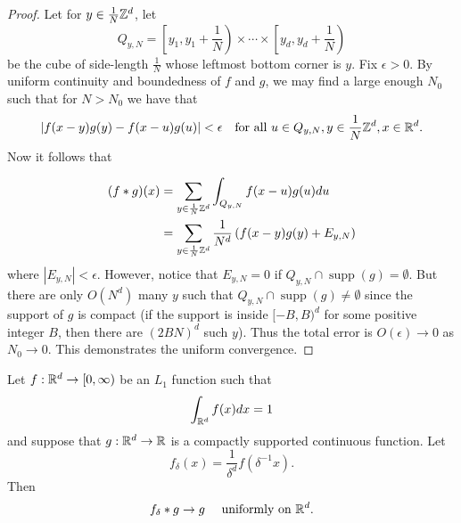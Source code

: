 \documentclass[twoside, a4paper, 10pt]{amsart}
\begin{document}
\begin{proof} Let for $y \in \frac{1}{N}\mathbb{Z}^d$, let $$Q_{y,N} = \left[y_1, y_1 + \frac{1}{N}\right) \times \cdots \times \left[y_d, y_d + \frac{1}{N}\right) $$ be the cube of side-length $\frac{1}{N}$ whose leftmost bottom corner is $y$. Fix $\epsilon>0$. By uniform continuity and boundedness of $f$ and $g$, we may find a large enough $N_0$ such that for $N>N_0$ we have that $$|f(x-y)g(y) - f(x-u)g(u)| < \epsilon \quad\text{for all } u \in Q_{y,N}, y \in \frac{1}{N}\mathbb{Z}^d, x \in \mathbb{R}^d.$$ Now it follows that 

\begin{align*} (f * g)(x) &= \sum_{y \in \frac{1}{N}\mathbb{Z}^d} \int_{Q_{y,N}} f(x-u)g(u) du \\ &= \sum_{y \in \frac{1}{N}\mathbb{Z}^d} \frac{1}{N^d}\left(f(x-y)g(y) + E_{y,N}\right)\end{align*} where $|E_{y,N}|<\epsilon$. However, notice that $E_{y,N} = 0$ if $Q_{y,N} \cap \operatorname{supp}(g) = \emptyset$. But there are only $O(N^d)$ many $y$ such that $Q_{y,N} \cap \operatorname{supp}(g) \neq \emptyset$ since the support of $g$ is compact (if the support is inside $[-B,B)^d$ for some positive integer $B$, then there are $(2BN)^d$ such $y$). Thus the total error is $O(\epsilon) \to 0$ as $N_0 \to 0$. This demonstrates the uniform convergence. \end{proof}

\begin{prop}\label{prop: approx identity} Let $f:\mathbb{R}^d \to [0,\infty)$ be an $L_1$ function such that $$\int_{\mathbb{R}^d} f(x) dx = 1$$ and suppose that $g:\mathbb{R}^d \to \mathbb{R}$ is a compactly supported continuous function. Let $$f_{\delta}(x) = \frac{1}{\delta^d}f(\delta^{-1} x).$$ Then $$f_{\delta} * g \to g \quad \text{ uniformly on } \mathbb{R}^d.$$

\end{prop}
\end{document}
